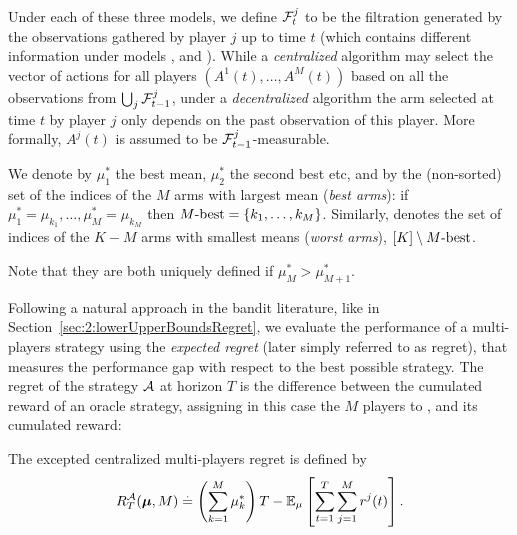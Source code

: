Under each of these three models, we define $\mathcal{F}^j_t$ to be the filtration generated by the observations gathered by player $j$ up to time $t$ (which contains different information under models \modelun, \modeldeux{} and \modeltrois).
While a \emph{centralized} algorithm may select the vector of actions for all players $(A^1(t),\dots,A^M(t))$ based on all the observations from $\bigcup_j \mathcal{F}^j_{t-1}$, under a \emph{decentralized} algorithm the arm selected at time $t$ by player $j$ only depends on the past observation of this player.
More formally, $A^j(t)$ is assumed to be $\mathcal{F}^j_{t-1}$-measurable.

\begin{definition}\label{def:5:MbestMworst}
\begin{leftbar}[defnbar]  %
  We denote by $\mu_1^*$ the best mean, $\mu_2^*$ the second best etc, and
  by \Mbest{} the (non-sorted) set of the indices of the $M$ arms with largest mean (\emph{best arms}): if $\mu_1^* = \mu_{k_1}, \dots, \mu_M^* = \mu_{k_M}$
  then $M\text{-}\mathrm{best} = \{k_1, \dots, k_M\}$.
  Similarly, \Mworst{} denotes the set of indices of the $K-M$ arms with smallest means (\emph{worst arms}),
  $[K] \setminus M\text{-}\mathrm{best}$.

  Note that they are both uniquely defined if $\mu_M^* > \mu_{M+1}^*$.
\end{leftbar}  %
\end{definition}

Following a natural approach in the bandit literature, like in Section~\ref{sec:2:lowerUpperBoundsRegret},
we evaluate the performance of a multi-players strategy using the \emph{expected regret} (later simply referred to as regret), that measures the performance gap with respect to the best possible strategy.
The regret of the strategy $\mathcal{A}$ at horizon $T$ is the difference between the cumulated reward of an oracle strategy, assigning in this case the $M$ players to \Mbest,
and its cumulated reward:

\begin{definition}
\begin{leftbar}[defnbar]  %
  The excepted centralized multi-players regret is defined by
  \begin{equation}\label{eq:5:regret}
    R_T^{\mathcal{A}}(\boldsymbol{\mu}, M) \overset{.}{=} \left(\sum_{k=1}^{M}\mu_k^*\right)T - \mathbb{E}_{\mu}\left[\sum_{t=1}^T\sum_{j=1}^M r^j(t)\right].
  \end{equation}
\end{leftbar}  %
\end{definition}

